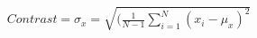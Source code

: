 \documentclass[preview]{standalone}
\begin{document}
\begin{align*}
Contrast = \sigma_x = \sqrt{(\frac{1}{N-1}\sum_{i=1}^{N}(x_i - \mu_x)^2}
\end{align*}
\end{document}

